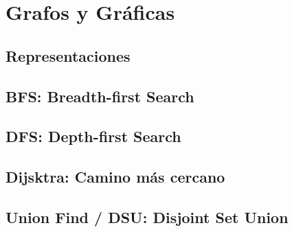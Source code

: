 \documentclass[12pt, fleqn]{report}                             %
\theoremstyle{break}                                            %
\begin{document}
    \chapter{Grafos y Gráficas}    

        \section{Representaciones}

        \section{BFS: Breadth-first Search}


        \section{DFS: Depth-first Search}

        \section{Dijsktra: Camino más cercano}

        \clearpage
        \section{Union Find / DSU: Disjoint Set Union}
\end{document}
